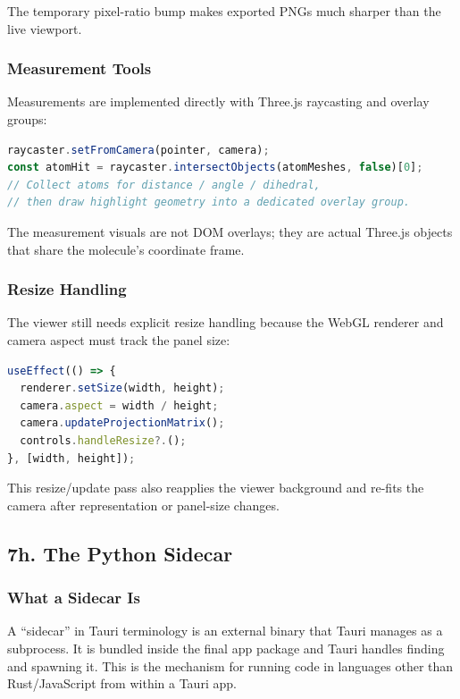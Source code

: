 \documentclass[11pt,a4paper]{article}
\begin{document}
The temporary pixel-ratio bump makes exported PNGs much sharper than the live viewport.

\subsubsection{Measurement Tools}

Measurements are implemented directly with Three.js raycasting and overlay groups:
\begin{lstlisting}[language=TypeScript]
raycaster.setFromCamera(pointer, camera);
const atomHit = raycaster.intersectObjects(atomMeshes, false)[0];
// Collect atoms for distance / angle / dihedral,
// then draw highlight geometry into a dedicated overlay group.
\end{lstlisting}

The measurement visuals are not DOM overlays; they are actual Three.js objects that
share the molecule's coordinate frame.

\subsubsection{Resize Handling}

The viewer still needs explicit resize handling because the WebGL renderer and camera
aspect must track the panel size:

\begin{lstlisting}[language=TypeScript]
useEffect(() => {
  renderer.setSize(width, height);
  camera.aspect = width / height;
  camera.updateProjectionMatrix();
  controls.handleResize?.();
}, [width, height]);
\end{lstlisting}

This resize/update pass also reapplies the viewer background and re-fits the camera
after representation or panel-size changes.

\subsection{7h. The Python Sidecar}

\subsubsection{What a Sidecar Is}

A ``sidecar'' in Tauri terminology is an external binary that Tauri manages as a
subprocess. It is bundled inside the final app package and Tauri handles finding and
spawning it. This is the mechanism for running code in languages other than
Rust/JavaScript from within a Tauri app.
\end{document}
